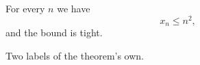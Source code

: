 \documentclass{article}
\begin{document}
\begin{theorem}\label{thm:a}
For every $n$ we have
\begin{equation}\label{eq:1}
x_n \le n^2,
\end{equation}
and the bound is tight.
\end{theorem}

\begin{theorem}\label{thm:b}\label{thm:b-alt}
Two labels of the theorem's own.
\end{theorem}
\end{document}
